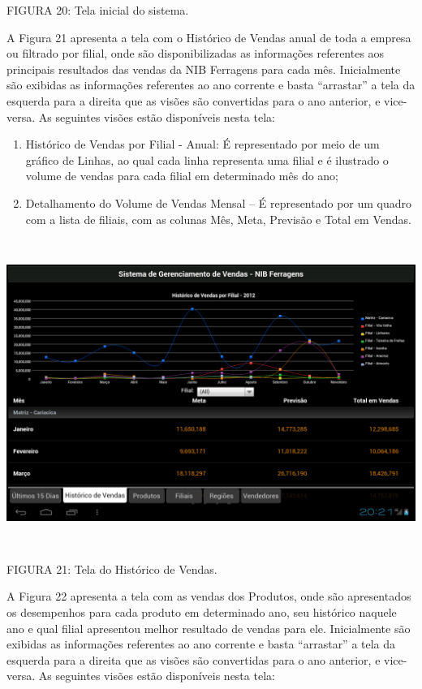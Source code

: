 \documentclass[a4paper]{article}
\newcommand\liststyleWWviiiNumxxxii{%
\renewcommand\theenumi{\alph{enumi}}
\renewcommand\theenumii{\alph{enumii}}
\renewcommand\theenumiii{\roman{enumiii}}
\renewcommand\theenumiv{\arabic{enumiv}}
\renewcommand\labelenumi{\theenumi)}
\renewcommand\labelenumii{\theenumii.}
\renewcommand\labelenumiii{\theenumiii.}
\renewcommand\labelenumiv{\theenumiv.}
}
\begin{document}
{
\textsf{\MakeUppercase{FIGURA 20}}\textsf{: Tela inicial do sistema. }}

{
\textsf{A Figura 21 apresenta a tela com o Hist\'orico de Vendas anual de toda a empresa ou filtrado por filial, onde
s\~ao disponibilizadas as informa\c{c}\~oes referentes aos principais resultados das vendas da NIB Ferragens para cada
m\^es. Inicialmente s\~ao exibidas as informa\c{c}\~oes referentes ao ano corrente e basta ``arrastar'' a tela da
esquerda para a direita que as vis\~oes s\~ao convertidas para o ano anterior, e vice-versa. As seguintes vis\~oes
est\~ao dispon\'iveis nesta tela:}}

\liststyleWWviiiNumxxxii
\begin{enumerate}
\item {
\textsf{Hist\'orico de Vendas por Filial - Anual: \'E representado por meio de um gr\'afico de Linhas, ao qual cada
linha representa uma filial e \'e ilustrado o volume de vendas para cada filial em determinado m\^es do ano;}}
\item {\sffamily
Detalhamento do Volume de Vendas Mensal -- \'E representado por um quadro com a lista de filiais, com as colunas M\^es,
Meta, Previs\~ao e Total em Vendas.}
\end{enumerate}
 \includegraphics[width=15.976cm,height=10.031cm]{monograph-img021.png} 

{
\textsf{\MakeUppercase{FIGURA 21}}\textsf{: Tela do Hist\'orico de Vendas. }}

{
\textsf{A Figura 22 apresenta a tela com as vendas dos Produtos, onde s\~ao apresentados os desempenhos para cada
produto em determinado ano, seu hist\'orico naquele ano e qual filial apresentou melhor resultado de vendas para ele.
Inicialmente s\~ao exibidas as informa\c{c}\~oes referentes ao ano corrente e basta ``arrastar'' a tela da esquerda
para a direita que as vis\~oes s\~ao convertidas para o ano anterior, e vice-versa. As seguintes vis\~oes est\~ao
dispon\'iveis nesta tela:}}
\end{document}
